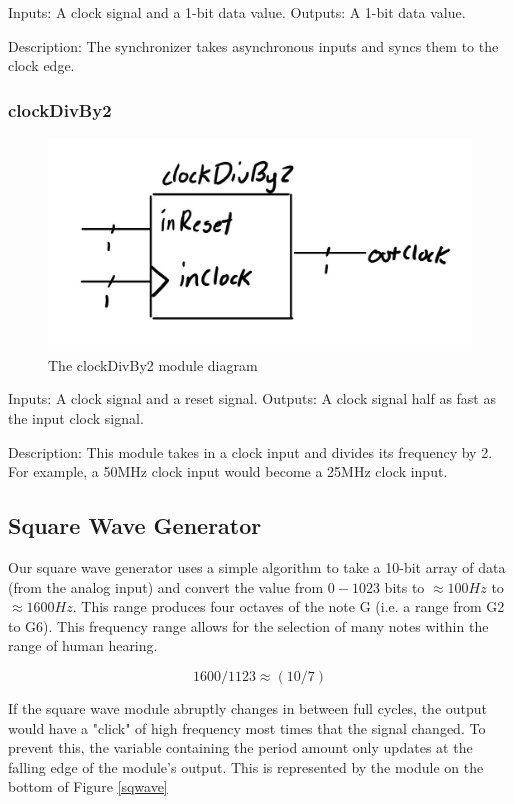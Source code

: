 \documentclass[a4paper]{article}
\begin{document}
Inputs: A clock signal and a 1-bit data value.
Outputs: A 1-bit data value.

Description: The synchronizer takes asynchronous inputs and syncs them to the clock edge.

\subsubsection{clockDivBy2}

\begin{figure}[H]
    \includegraphics[width=0.8 \linewidth]{images/clockDivBy2.JPG}
    \caption{The clockDivBy2 module diagram}
    \label{clockDivBy2Diagram}
\end{figure}

Inputs: A clock signal and a reset signal.
Outputs: A clock signal half as fast as the input clock signal.

Description: This module takes in a clock input and divides its frequency by 2. For example, a 50MHz clock input would become a 25MHz clock input.

\subsection{Square Wave Generator}
Our square wave generator uses a simple algorithm to take a 10-bit array of data (from the analog input) and convert the value from $0-1023 $ bits to $\approx 100Hz $ to$ \approx 1600 Hz$. This range produces four octaves of the note G (i.e. a range from G2 to G6). This frequency range allows for the selection of many notes within the range of human hearing. 


\begin{equation}
1600/1123 \approx (10/7)
\end{equation}

If the square wave module abruptly changes in between full cycles, the output would have a "click" of high frequency most times that the signal changed. To prevent this, the variable containing the period amount only updates at the falling edge of the module's output. This is represented by the module on the bottom of Figure \ref{sqwave}
\end{document}
